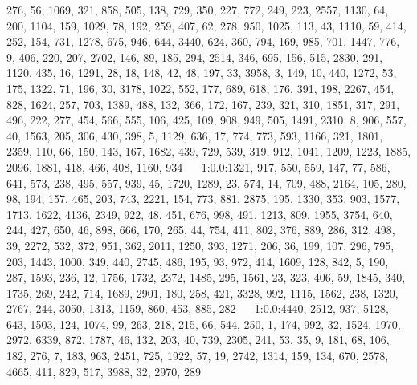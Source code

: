 \documentclass[a4paper,11pt,oneside]{book}
\begin{document}
276, 56, 1069, 321, 858, 505, 138, 729, 350, 227, 772, 249, 223, 2557, 1130, 64, 200, 1104, 159, 1029, 78, 192, 259, 407, 62, 278, 950, 1025, 113, 43, 1110, 59, 414, 252, 154, 731, 1278, 675, 946, 644, 3440, 624, 360, 794, 169, 985, 701, 1447, 776, 9, 406, 220, 207, 2702, 146, 89, 185, 294, 2514, 346, 695, 156, 515, 2830, 291, 1120, 435, 16, 1291, 28, 18, 148, 42, 48, 197, 33, 3958, 3, 149, 10, 440, 1272, 53, 175, 1322, 71, 196, 30, 3178, 1022, 552, 177, 689, 618, 176, 391, 198, 2267, 454, 828, 1624, 257, 703, 1389, 488, 132, 366, 172, 167, 239, 321, 310, 1851, 317, 291, 496, 222, 277, 454, 566, 555, 106, 425, 109, 908, 949, 505, 1491, 2310, 8, 906, 557, 40, 1563, 205, 306, 430, 398, 5, 1129, 636, 17, 774, 773, 593, 1166, 321, 1801, 2359, 110, 66, 150, 143, 167, 1682, 439, 729, 539, 319, 912, 1041, 1209, 1223, 1885, 2096, 1881, 418, 466, 408, 1160, 934	$\quad$	1:0.0:1321, 917, 550, 559, 147, 77, 586, 641, 573, 238, 495, 557, 939, 45, 1720, 1289, 23, 574, 14, 709, 488, 2164, 105, 280, 98, 194, 157, 465, 203, 743, 2221, 154, 773, 881, 2875, 195, 1330, 353, 903, 1577, 1713, 1622, 4136, 2349, 922, 48, 451, 676, 998, 491, 1213, 809, 1955, 3754, 640, 244, 427, 650, 46, 898, 666, 170, 265, 44, 754, 411, 802, 376, 889, 286, 312, 498, 39, 2272, 532, 372, 951, 362, 2011, 1250, 393, 1271, 206, 36, 199, 107, 296, 795, 203, 1443, 1000, 349, 440, 2745, 486, 195, 93, 972, 414, 1609, 128, 842, 5, 190, 287, 1593, 236, 12, 1756, 1732, 2372, 1485, 295, 1561, 23, 323, 406, 59, 1845, 340, 1735, 269, 242, 714, 1689, 2901, 180, 258, 421, 3328, 992, 1115, 1562, 238, 1320, 2767, 244, 3050, 1313, 1159, 860, 453, 885, 282	$\quad$	1:0.0:4440, 2512, 937, 5128, 643, 1503, 124, 1074, 99, 263, 218, 215, 66, 544, 250, 1, 174, 992, 32, 1524, 1970, 2972, 6339, 872, 1787, 46, 132, 203, 40, 739, 2305, 241, 53, 35, 9, 181, 68, 106, 182, 276, 7, 183, 963, 2451, 725, 1922, 57, 19, 2742, 1314, 159, 134, 670, 2578, 4665, 411, 829, 517, 3988, 32, 2970, 289	$\quad$	
\end{document}
